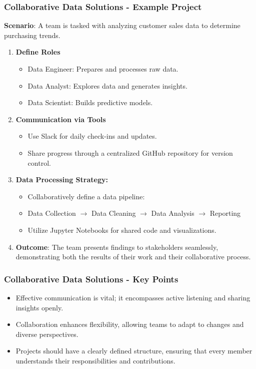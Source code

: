 \documentclass{beamer}
\begin{document}
\begin{frame}[fragile]
    \frametitle{Collaborative Data Solutions - Example Project}
    \textbf{Scenario}: A team is tasked with analyzing customer sales data to determine purchasing trends.
    
    \begin{enumerate}
        \item \textbf{Define Roles}
            \begin{itemize}
                \item Data Engineer: Prepares and processes raw data.
                \item Data Analyst: Explores data and generates insights.
                \item Data Scientist: Builds predictive models.
            \end{itemize}

        \item \textbf{Communication via Tools}
            \begin{itemize}
                \item Use Slack for daily check-ins and updates.
                \item Share progress through a centralized GitHub repository for version control.
            \end{itemize}

        \item \textbf{Data Processing Strategy:}
        \begin{itemize}
            \item Collaboratively define a data pipeline: 
            \item Data Collection $\rightarrow$ Data Cleaning $\rightarrow$ Data Analysis $\rightarrow$ Reporting
            \item Utilize Jupyter Notebooks for shared code and visualizations.
        \end{itemize}

        \item \textbf{Outcome}: The team presents findings to stakeholders seamlessly, demonstrating both the results of their work and their collaborative process.
    \end{enumerate}
\end{frame}

\begin{frame}[fragile]
    \frametitle{Collaborative Data Solutions - Key Points}
    \begin{itemize}
        \item Effective communication is vital; it encompasses active listening and sharing insights openly.
        \item Collaboration enhances flexibility, allowing teams to adapt to changes and diverse perspectives.
        \item Projects should have a clearly defined structure, ensuring that every member understands their responsibilities and contributions.
    \end{itemize}
\end{frame}
\end{document}
